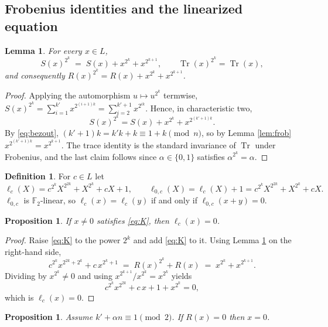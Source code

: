 \documentclass[11pt,a4paper]{article}
\newtheorem{proposition}[theorem]{Proposition}
\newtheorem{lemma}[theorem]{Lemma}
\theoremstyle{definition}
\newtheorem{definition}[theorem]{Definition}
\newcommand{\F}{\mathbb{F}}
\newcommand{\Tr}{\operatorname{Tr}}
\newcommand{\rhs}{R}
\begin{document}
\subsection{Frobenius identities and the linearized equation}

\begin{lemma}\label{lem:shift}
For every $x\in L$,
\[
  S(x)^{2^{k}}\;=\;S(x)+x^{2^{k}}+x^{2^{k+1}},\qquad
  \Tr(x)^{2^{k}}=\Tr(x),
\]
and consequently $\rhs(x)^{2^{k}}=\rhs(x)+x^{2^{k}}+x^{2^{k+1}}$.
\end{lemma}

\begin{proof}
Applying the automorphism $u\mapsto u^{2^{k}}$ termwise,
$S(x)^{2^{k}}=\sum_{i=1}^{k'}x^{2^{(i+1)k}}=\sum_{i=2}^{k'+1}x^{2^{ik}}$.  Hence,
in characteristic two,
\[
  S(x)^{2^{k}}=S(x)+x^{2^{k}}+x^{2^{(k'+1)k}} .
\]
By \eqref{eq:bezout}, $(k'+1)k=k'k+k\equiv 1+k \pmod n$, so by Lemma
\ref{lem:frob} $x^{2^{(k'+1)k}}=x^{2^{k+1}}$.  The trace identity is the standard
invariance of $\Tr$ under Frobenius, and the last claim follows since
$\alpha\in\{0,1\}$ satisfies $\alpha^{2^{k}}=\alpha$.
\end{proof}

\begin{definition}
For $c\in L$ let
\[
  \ell_c(X)=c^{2^{k}}X^{2^{2k}}+X^{2^{k}}+cX+1,\qquad
  \ell_{0,c}(X)=\ell_c(X)+1=c^{2^{k}}X^{2^{2k}}+X^{2^{k}}+cX .
\]
$\ell_{0,c}$ is $\F_2$-linear, so $\ell_c(x)=\ell_c(y)$ if and only if
$\ell_{0,c}(x+y)=0$.
\end{definition}

\begin{proposition}\label{prop:linearized}
If $x\neq0$ satisfies \eqref{eq:K}, then $\ell_c(x)=0$.
\end{proposition}

\begin{proof}
Raise \eqref{eq:K} to the power $2^{k}$ and add \eqref{eq:K} to it.  Using Lemma
\ref{lem:shift} on the right-hand side,
\[
  c^{2^{k}}x^{2^{2k}+2^{k}}+c\,x^{2^{k}+1}
  \;=\;\rhs(x)^{2^{k}}+\rhs(x)\;=\;x^{2^{k}}+x^{2^{k+1}} .
\]
Dividing by $x^{2^{k}}\neq0$ and using $x^{2^{k+1}}/x^{2^{k}}=x^{2^{k}}$ yields
\[
  c^{2^{k}}x^{2^{2k}}+c\,x+1+x^{2^{k}}=0,
\]
which is $\ell_c(x)=0$.
\end{proof}

\begin{proposition}\label{prop:zerofibre}
Assume $k'+\alpha n\equiv 1 \pmod 2$.  If $\rhs(x)=0$ then $x=0$.
\end{proposition}
\end{document}
